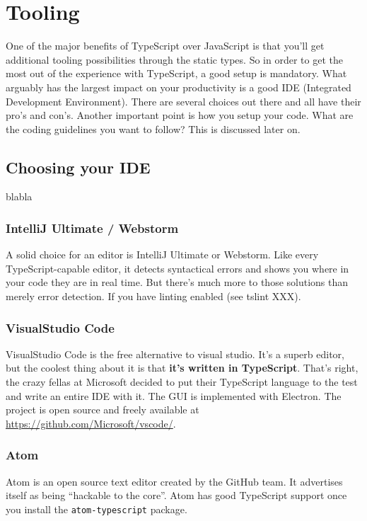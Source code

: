 \documentclass[12pt,a4paper]{report}
\begin{document}
\chapter{Tooling}

One of the major benefits of TypeScript over JavaScript is that you'll get additional tooling possibilities through the static types. So in order to get the most out of the experience with TypeScript, a good setup is mandatory. What arguably has the largest impact on your productivity is a good IDE (Integrated Development Environment). There are several choices out there and all have their pro's and con's. Another important point is how you setup your code. What are the coding guidelines you want to follow? This is discussed later on.

\section{Choosing your IDE}

blabla

\subsection{IntelliJ Ultimate / Webstorm}
A solid choice for an editor is IntelliJ Ultimate or Webstorm. Like every TypeScript-capable editor, it detects syntactical errors and shows you where in your code they are in real time. But there's much more to those solutions than merely error detection. If you have linting enabled (see tslint XXX).

\subsection{VisualStudio Code}
VisualStudio Code is the free alternative to visual studio. It's a superb editor, but the coolest thing about it is that \textbf{it's written in TypeScript}. That's right, the crazy fellas at Microsoft decided to put their TypeScript language to the test and write an entire IDE with it. The GUI is implemented with Electron. The project is open source and freely available at \url{https://github.com/Microsoft/vscode/}.

\subsection{Atom}
Atom is an open source text editor created by the GitHub team. It advertises itself as being ``hackable to the core''. Atom has good TypeScript support once you install the \texttt{atom-typescript} package.
\end{document}

